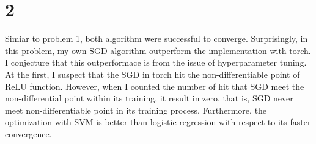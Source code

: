 \documentclass[10pt]{article}
\begin{document}
\section*{2}
Simiar to problem 1, both algorithm were successful to converge. Surprisingly, in this problem, my own SGD algorithm outperform the implementation with torch.
I conjecture that this outperformace is from the issue of hyperparameter tuning. At the first, I suspect that the SGD in torch hit the non-differentiable point of ReLU function.
However, when I counted the number of hit that SGD meet the non-differential point within its training, it result in zero, that is, SGD never meet non-differentiable point in its training process. 
Furthermore, the optimization with SVM is better than logistic regression with respect to its faster convergence.

\begin{figure}[!h]
    \begin{center}
\end{center}
\end{figure}
\end{document}
